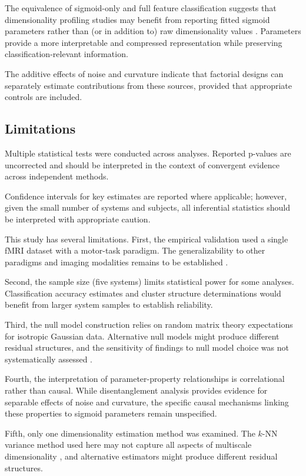 \documentclass[11pt]{article}
\begin{document}
The equivalence of sigmoid-only and full feature classification suggests that dimensionality profiling studies may benefit from reporting fitted sigmoid parameters rather than (or in addition to) raw dimensionality values \citep{paper3, paper4}. Parameters provide a more interpretable and compressed representation while preserving classification-relevant information.

The additive effects of noise and curvature indicate that factorial designs can separately estimate contributions from these sources, provided that appropriate controls are included.

\subsection{Limitations}

Multiple statistical tests were conducted across analyses. Reported p-values are uncorrected and should be interpreted in the context of convergent evidence across independent methods.

Confidence intervals for key estimates are reported where applicable; however, given the small number of systems and subjects, all inferential statistics should be interpreted with appropriate caution.

This study has several limitations. First, the empirical validation used a single fMRI dataset with a motor-task paradigm. The generalizability to other paradigms and imaging modalities remains to be established \citep{gao2017emergence}.

Second, the sample size (five systems) limits statistical power for some analyses. Classification accuracy estimates and cluster structure determinations would benefit from larger system samples to establish reliability.

Third, the null model construction relies on random matrix theory expectations for isotropic Gaussian data. Alternative null models might produce different residual structures, and the sensitivity of findings to null model choice was not systematically assessed \citep{marchenko1967distribution, couillet2011random}.

Fourth, the interpretation of parameter-property relationships is correlational rather than causal. While disentanglement analysis provides evidence for separable effects of noise and curvature, the specific causal mechanisms linking these properties to sigmoid parameters remain unspecified.

Fifth, only one dimensionality estimation method was examined. The $k$-NN variance method used here may not capture all aspects of multiscale dimensionality \citep{facco2017estimating}, and alternative estimators might produce different residual structures.
\end{document}
